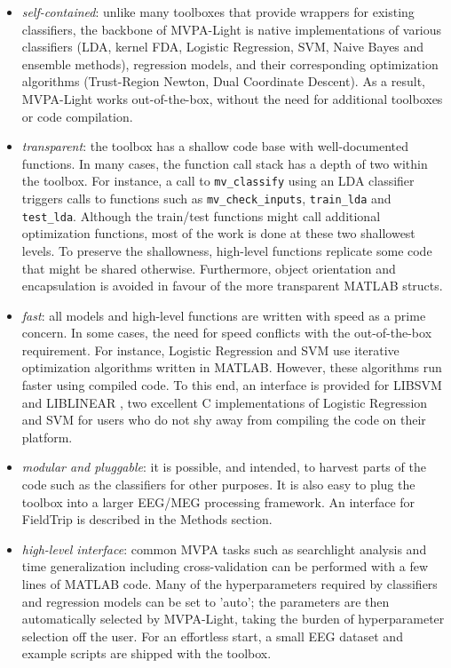 \documentclass[utf8]{frontiersSCNS} %
\begin{document}
\begin{itemize}
\item \textit{self-contained}: unlike many toolboxes that provide wrappers for existing classifiers, the backbone of MVPA-Light is  native implementations of various classifiers (LDA, kernel FDA, Logistic Regression, SVM, Naive Bayes and ensemble methods), regression models, and their corresponding optimization algorithms (Trust-Region Newton, Dual Coordinate Descent). As a result, MVPA-Light works out-of-the-box, without the need for additional toolboxes or  code compilation.
\item \textit{transparent}: the toolbox has a shallow code base with well-documented functions. In many cases, the function call stack has a depth of two within the toolbox. For instance, a call to \texttt{mv\_classify} using an LDA classifier triggers calls to functions such as  \texttt{mv\_check\_inputs}, \texttt{train\_lda} and \texttt{test\_lda}. Although the train/test functions might call additional optimization functions, most of the work is done at these two shallowest levels. To preserve the shallowness, high-level functions replicate some code that might be shared otherwise. Furthermore, object orientation and encapsulation is avoided in favour of the more transparent MATLAB structs.
\item \textit{fast}: all models and high-level functions are written with speed as a prime concern. In some cases, the need for speed conflicts with the out-of-the-box requirement. For instance, Logistic Regression and SVM use iterative optimization algorithms written in MATLAB. However, these algorithms run faster using compiled code. To this end, an interface is provided for LIBSVM \citep{Chang2011LIBSVM:Machines} and LIBLINEAR \citep{Fan2008}, two excellent C implementations of Logistic Regression and SVM for users who do not shy away from compiling the code on their platform.
\item \textit{modular and pluggable}: it is possible, and intended, to harvest parts of the code such as the classifiers for other purposes. It is also easy to plug the toolbox into a larger EEG/MEG processing framework. An interface for FieldTrip \citep{Oostenveld2011} is described in the Methods section.
\item \textit{high-level interface}: common MVPA tasks such as searchlight analysis and time generalization including cross-validation can be performed with a few lines of MATLAB code. Many of the hyperparameters required by classifiers and regression models can be set to 'auto'; the parameters are then automatically selected by MVPA-Light, taking the burden of hyperparameter selection off the user. For an effortless start, a small EEG dataset and example scripts are shipped with the toolbox.
\end{itemize}
\end{document}
